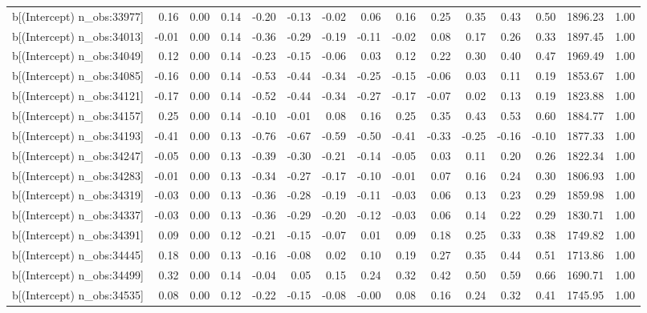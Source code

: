 \begin{table}[ht]
\begin{tabular}{rrrrrrrrrrrrrrr}
  b[(Intercept) n\_obs:33977] & 0.16 & 0.00 & 0.14 & -0.20 & -0.13 & -0.02 & 0.06 & 0.16 & 0.25 & 0.35 & 0.43 & 0.50 & 1896.23 & 1.00 \\ 
  b[(Intercept) n\_obs:34013] & -0.01 & 0.00 & 0.14 & -0.36 & -0.29 & -0.19 & -0.11 & -0.02 & 0.08 & 0.17 & 0.26 & 0.33 & 1897.45 & 1.00 \\ 
  b[(Intercept) n\_obs:34049] & 0.12 & 0.00 & 0.14 & -0.23 & -0.15 & -0.06 & 0.03 & 0.12 & 0.22 & 0.30 & 0.40 & 0.47 & 1969.49 & 1.00 \\ 
  b[(Intercept) n\_obs:34085] & -0.16 & 0.00 & 0.14 & -0.53 & -0.44 & -0.34 & -0.25 & -0.15 & -0.06 & 0.03 & 0.11 & 0.19 & 1853.67 & 1.00 \\ 
  b[(Intercept) n\_obs:34121] & -0.17 & 0.00 & 0.14 & -0.52 & -0.44 & -0.34 & -0.27 & -0.17 & -0.07 & 0.02 & 0.13 & 0.19 & 1823.88 & 1.00 \\ 
  b[(Intercept) n\_obs:34157] & 0.25 & 0.00 & 0.14 & -0.10 & -0.01 & 0.08 & 0.16 & 0.25 & 0.35 & 0.43 & 0.53 & 0.60 & 1884.77 & 1.00 \\ 
  b[(Intercept) n\_obs:34193] & -0.41 & 0.00 & 0.13 & -0.76 & -0.67 & -0.59 & -0.50 & -0.41 & -0.33 & -0.25 & -0.16 & -0.10 & 1877.33 & 1.00 \\ 
  b[(Intercept) n\_obs:34247] & -0.05 & 0.00 & 0.13 & -0.39 & -0.30 & -0.21 & -0.14 & -0.05 & 0.03 & 0.11 & 0.20 & 0.26 & 1822.34 & 1.00 \\ 
  b[(Intercept) n\_obs:34283] & -0.01 & 0.00 & 0.13 & -0.34 & -0.27 & -0.17 & -0.10 & -0.01 & 0.07 & 0.16 & 0.24 & 0.30 & 1806.93 & 1.00 \\ 
  b[(Intercept) n\_obs:34319] & -0.03 & 0.00 & 0.13 & -0.36 & -0.28 & -0.19 & -0.11 & -0.03 & 0.06 & 0.13 & 0.23 & 0.29 & 1859.98 & 1.00 \\ 
  b[(Intercept) n\_obs:34337] & -0.03 & 0.00 & 0.13 & -0.36 & -0.29 & -0.20 & -0.12 & -0.03 & 0.06 & 0.14 & 0.22 & 0.29 & 1830.71 & 1.00 \\ 
  b[(Intercept) n\_obs:34391] & 0.09 & 0.00 & 0.12 & -0.21 & -0.15 & -0.07 & 0.01 & 0.09 & 0.18 & 0.25 & 0.33 & 0.38 & 1749.82 & 1.00 \\ 
  b[(Intercept) n\_obs:34445] & 0.18 & 0.00 & 0.13 & -0.16 & -0.08 & 0.02 & 0.10 & 0.19 & 0.27 & 0.35 & 0.44 & 0.51 & 1713.86 & 1.00 \\ 
  b[(Intercept) n\_obs:34499] & 0.32 & 0.00 & 0.14 & -0.04 & 0.05 & 0.15 & 0.24 & 0.32 & 0.42 & 0.50 & 0.59 & 0.66 & 1690.71 & 1.00 \\ 
  b[(Intercept) n\_obs:34535] & 0.08 & 0.00 & 0.12 & -0.22 & -0.15 & -0.08 & -0.00 & 0.08 & 0.16 & 0.24 & 0.32 & 0.41 & 1745.95 & 1.00 \\ 

\end{tabular}
\end{table}
